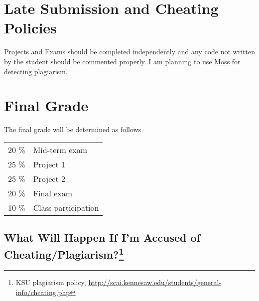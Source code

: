 \documentclass[12pt]{article}
\begin{document}
\section{Late Submission and Cheating Policies}
Projects and Exams should be completed independently and any code not written by the student should be commented properly. I am planning to use \href{http://theory.stanford.edu/~aiken/moss/}{Moss} for detecting plagiarism. 

\section{Final Grade}
The final grade will be determined as follows

\begin{tabular}{c|l}
\hline\hline
 20 \%& Mid-term exam  \\
 25 \%& Project 1  \\
 25 \%& Project 2 \\
 20 \%& Final exam \\
 10 \%& Class participation 
\end{tabular}

\subsection*{What Will Happen If I'm Accused of Cheating/Plagiarism?\footnote{KSU plagiarism policy, \url{http://scai.kennesaw.edu/students/general-info/cheating.php}}}
\end{document}
